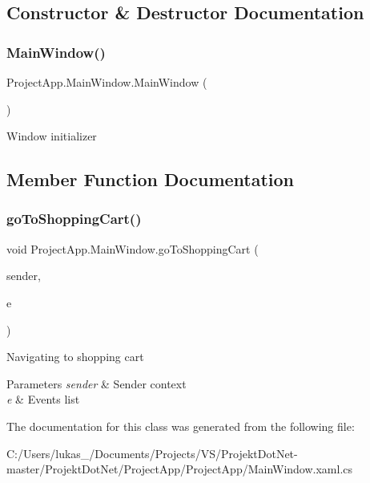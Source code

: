 \subsection{Constructor \& Destructor Documentation}
\mbox{\label{class_project_app_1_1_main_window_ae91410d182d0b610e1af5552c7440321}} 
\subsubsection{\texorpdfstring{Main\+Window()}{MainWindow()}}
{\footnotesize\ttfamily Project\+App.\+Main\+Window.\+Main\+Window (\begin{DoxyParamCaption}{ }\end{DoxyParamCaption})}



Window initializer 



\subsection{Member Function Documentation}
\mbox{\label{class_project_app_1_1_main_window_a0cecd119e88b9d69affe8fa48210e0a5}} 
\subsubsection{\texorpdfstring{go\+To\+Shopping\+Cart()}{goToShoppingCart()}}
{\footnotesize\ttfamily void Project\+App.\+Main\+Window.\+go\+To\+Shopping\+Cart (\begin{DoxyParamCaption}\item[{object}]{sender,  }\item[{Routed\+Event\+Args}]{e }\end{DoxyParamCaption})\hspace{0.3cm}{\ttfamily [private]}}



Navigating to shopping cart 


\begin{DoxyParams}{Parameters}
{\em sender} & Sender context\\
\hline
{\em e} & Events list\\
\hline
\end{DoxyParams}


The documentation for this class was generated from the following file\+:\begin{DoxyCompactItemize}
\item 
C\+:/\+Users/lukas\+\_/\+Documents/\+Projects/\+V\+S/\+Projekt\+Dot\+Net-\/master/\+Projekt\+Dot\+Net/\+Project\+App/\+Project\+App/Main\+Window.\+xaml.\+cs\end{DoxyCompactItemize}
